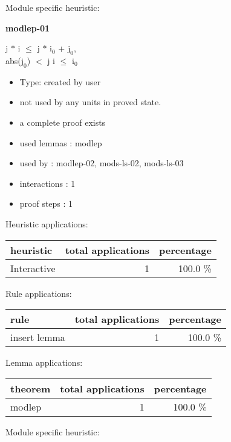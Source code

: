 \documentclass[a4paper]{article}
\begin{document}
Module specific heuristic:

\pagebreak

{\LARGE\bf modlep-01}\label{lemma-modlep-01}

\medskip

j $*$ i $\le$ j $*$ $\mbox{i}_{0}$ + $\mbox{j}_{0}$, \\
abs($\mbox{j}_{0}$) $<$ j \Fol i $\le$ $\mbox{i}_{0}$

\begin{itemize}

\item Type: created by user

\item not used by any units in proved state.
\item       a complete proof exists
\item       used lemmas  : modlep
\item       used by      : modlep-02, mods-ls-02, mods-ls-03
\item       interactions : 1
\item       proof steps  : 1
\end{itemize}

\medskip


Heuristic applications:

\begin{supertabular}{l|r|r}
heuristic	& total applications & percentage \\ \hline
Interactive & 1 & 100.0 \% \\

\end{supertabular}

Rule applications:

\begin{supertabular}{l|r|r}
rule	        & total applications & percentage \\ \hline
insert lemma & 1 & 100.0 \% \\

\end{supertabular}

Lemma applications:

\begin{supertabular}{l|r|r}
theorem	        & total applications & percentage \\ \hline
modlep & 1 & 100.0 \% \\

\end{supertabular}

Module specific heuristic:
\end{document}
